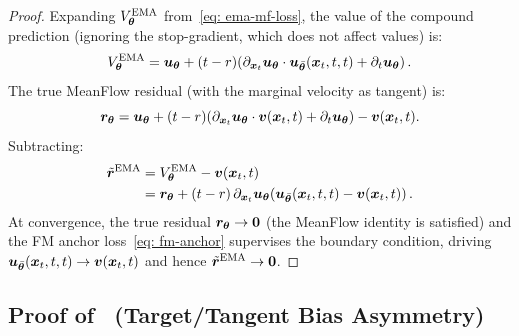 \begin{appendices}
    \begin{proof}
        Expanding $V_{{\bm{\theta}}}^{\text{EMA}}$ from~\eqref{eq: ema-mf-loss}, the value of the compound prediction (ignoring the stop-gradient, which does not affect values) is:
        \begin{equation}
            V_{{\bm{\theta}}}^{\text{EMA}}={\bm{u}}_{{\bm{\theta}}}+(t-r)\!\left(\partial_{{\bm{x}}_{t}}{\bm{u}}_{{\bm{\theta}}}\cdot{\bm{u}}_{\bar{{\bm{\theta}}}}({\bm{x}}_{t},t,t)+\partial_{t}{\bm{u}}_{{\bm{\theta}}}\right).
        \end{equation}
        The true MeanFlow residual (with the marginal velocity as tangent) is:
        \begin{equation}
            {\bm{r}}_{{\bm{\theta}}}={\bm{u}}_{{\bm{\theta}}}+(t-r)\!\left(\partial_{{\bm{x}}_{t}}{\bm{u}}_{{\bm{\theta}}}\cdot{\bm{v}}({\bm{x}}_{t},t)+\partial_{t}{\bm{u}}_{{\bm{\theta}}}\right)-{\bm{v}}({\bm{x}}_{t},t).
        \end{equation}
        Subtracting:
        \begin{align}
            \tilde{{\bm{r}}}^{\text{EMA}}&=V_{{\bm{\theta}}}^{\text{EMA}}-{\bm{v}}({\bm{x}}_{t},t) \nonumber\\
            &={\bm{r}}_{{\bm{\theta}}}+(t-r)\,\partial_{{\bm{x}}_{t}}{\bm{u}}_{{\bm{\theta}}}\!\left({\bm{u}}_{\bar{{\bm{\theta}}}}({\bm{x}}_{t},t,t)-{\bm{v}}({\bm{x}}_{t},t)\right).
        \end{align}
        At convergence, the true residual ${\bm{r}}_{{\bm{\theta}}}\to\bm{0}$ (the MeanFlow identity is satisfied) and the FM anchor loss~\eqref{eq: fm-anchor} supervises the boundary condition, driving ${\bm{u}}_{\bar{{\bm{\theta}}}}({\bm{x}}_{t},t,t)\to{\bm{v}}({\bm{x}}_{t},t)$ and hence $\tilde{{\bm{r}}}^{\text{EMA}}\to\bm{0}$.
    \end{proof}

    \subsection{Proof of~ (Target/Tangent Bias Asymmetry)}


\end{appendices}
